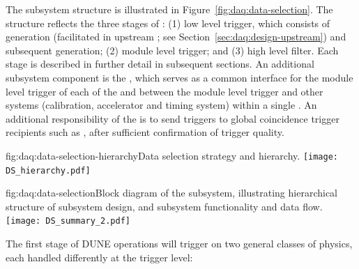 The subsystem structure is illustrated in
Figure~\ref{fig:daq:data-selection}. The structure
reflects the three stages of : (1) low level trigger, which consists of
 generation (facilitated in upstream ; see
Section~\ref{sec:daq:design-upstream}) and subsequent
 generation; (2) module level trigger; and (3)
high level filter. Each stage is described in further detail in subsequent
sections. An additional subsystem component is the ,
which serves as a common interface for the
module level trigger of each of the   and between
the module level trigger and other systems (calibration,
accelerator and timing system) within a single
. An additional responsibility of the
 is to send  triggers
to global coincidence trigger recipients such as 
\cite{snews}, after sufficient confirmation of trigger quality.

\begin{dunefigure}{fig:daq:data-selection-hierarchy}{Data selection
    strategy and hierarchy.}
  \texttt{[image: DS\_hierarchy.pdf]}
\end{dunefigure}

\begin{dunefigure}{fig:daq:data-selection}{Block diagram of the  
     subsystem, illustrating hierarchical structure of
    subsystem design, and subsystem functionality and data flow.}
  \texttt{[image: DS\_summary\_2.pdf]}
\end{dunefigure}

The first stage of DUNE  operations will trigger on two general
classes of physics, each handled differently at the trigger level:

